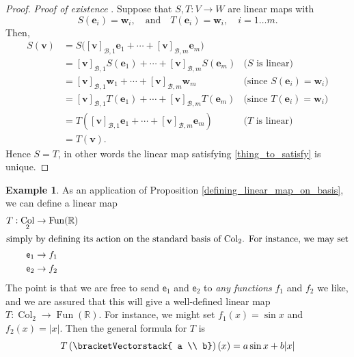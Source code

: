 \documentclass[a4paper,11pt]{book}
\theoremstyle{definition}
\newtheorem{example_environment}{Example}[chapter]
\newcommand{\be}{\begin{equation}}
\newcommand{\ee}{\end{equation}}
\newcommand{\ve}[1]{\mathbf{#1}}
\newcommand{\mat}[1]{\mathsf{#1}}
\newcommand{\basis}[1]{{\mathcal #1}}
\newcommand{\cvector}[1]{\bracketVectorstack{#1}}
\newenvironment{example}
	{
		\begin{oframed} 
		\begin{example_environment}
	}
	{
		\end{example_environment}
		\end{oframed}
	}
\DeclareMathOperator{\Fun}{Fun}
\DeclareMathOperator{\Col}{Col}
\begin{document}
\begin{proof} {\em Proof of existence}
. Suppose that $S, T  : V \rightarrow W$ are linear maps with
\be \label{thing_to_satisfy}
 S(\ve{e}_i) = \ve{w}_i, \quad \text{and} \quad T(\ve{e}_i) = \ve{w}_i, \quad i = 1 \ldots m.
\ee
Then,
\begin{align*}
 S (\ve{v}) &= S\big([\ve{v}]_{\basis{B}, 1} \ve{e}_1 + \cdots + [\ve{v}]_{\basis{B}, m} \ve{e}_m\big) \\
  &= [\ve{v}]_{\basis{B}, 1} S(\ve{e}_1) + \cdots + [\ve{v}]_{\basis{B}, m} S(\ve{e}_m) & \mbox{($S$ is linear)} \\
  &= [\ve{v}]_{\basis{B}, 1} \ve{w}_1 + \cdots + [\ve{v}]_{\basis{B}, m} \ve{w}_m & \mbox{(since $S(\ve{e}_i) = \ve{w}_i$)} \\
  &= [\ve{v}]_{\basis{B}, 1} T(\ve{e}_1) + \cdots + [\ve{v}]_{\basis{B}, m} T(\ve{e}_m) & \mbox{(since $T(\ve{e}_i) = \ve{w}_i$)} \\
  &= T([\ve{v}]_{\basis{B}, 1} \ve{e}_1 +  \cdots + [\ve{v}]_{\basis{B}, m} \ve{e}_m) & \mbox{($T$ is linear)} \\
  &= T(\ve{v}).  
\end{align*}
Hence $S = T$, in other words the linear map satisfying \eqref{thing_to_satisfy} is unique.
\end{proof}

\begin{example} As an application of Proposition \ref{defining_linear_map_on_basis}, we can define a linear map
\begin{align*}
 T : \Col_2 & \rightarrow \Fun(\mathbb{R}) \\
 \intertext{simply by defining its action on the standard basis of $\Col_2$. For instance, we may set}
 \mat{e}_1 & \rightarrow f_1 \\
 \mat{e}_2 & \rightarrow f_2
\end{align*}
The point is that we are free to send $\mat{e}_1$ and $\mat{e}_2$ to {\em any functions} $f_1$ and $f_2$ we like, and we are assured that this will give a well-defined linear map $T : \Col_2 \rightarrow \Fun(\mathbb{R})$. For instance, we might set $f_1 (x) = \sin x$ and $f_2 (x) = |x|$. Then the general formula for $T$ is 
\[
 T \left( \cvector{ a \\ b} \right) (x) = a \sin x + b |x|
\]
\end{example}
\end{document}
